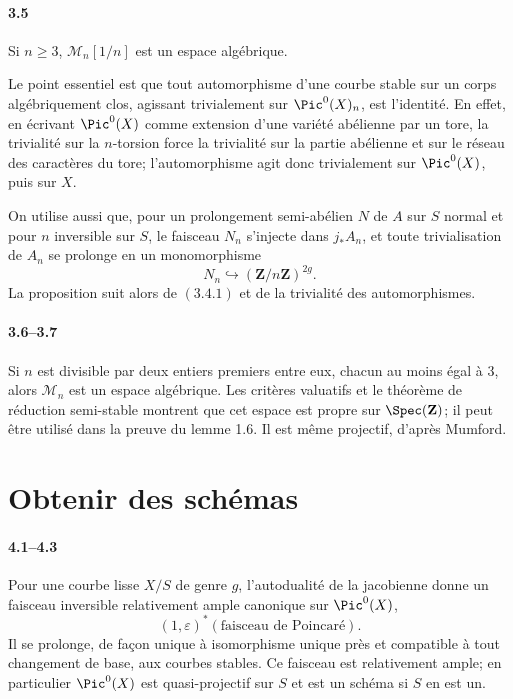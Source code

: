 \paragraph{3.5}
\begin{proposition}
Si $n\ge3$, $\mathcal M_n[1/n]$ est un espace algébrique.
\end{proposition}

Le point essentiel est que tout automorphisme d'une courbe stable sur un corps algébriquement clos, agissant trivialement sur $\Pic^0(X)_n$, est l'identité. En effet, en écrivant $\Pic^0(X)$ comme extension d'une variété abélienne par un tore, la trivialité sur la $n$-torsion force la trivialité sur la partie abélienne et sur le réseau des caractères du tore; l'automorphisme agit donc trivialement sur $\Pic^0(X)$, puis sur $X$.

On utilise aussi que, pour un prolongement semi-abélien $N$ de $A$ sur $S$ normal et pour $n$ inversible sur $S$, le faisceau $N_n$ s'injecte dans $j_*A_n$, et toute trivialisation de $A_n$ se prolonge en un monomorphisme
\[
  N_n\hookrightarrow (\mathbf Z/n\mathbf Z)^{2g}.
\]
La proposition suit alors de \((3.4.1)\) et de la trivialité des automorphismes.

\paragraph{3.6--3.7}
Si $n$ est divisible par deux entiers premiers entre eux, chacun au moins égal à $3$, alors $\mathcal M_n$ est un espace algébrique. Les critères valuatifs et le théorème de réduction semi-stable montrent que cet espace est propre sur $\Spec(\mathbf Z)$; il peut être utilisé dans la preuve du lemme 1.6. Il est même projectif, d'après Mumford.

\section{Obtenir des schémas}

\paragraph{4.1--4.3}
Pour une courbe lisse $X/S$ de genre $g$, l'autodualité de la jacobienne donne un faisceau inversible relativement ample canonique sur $\Pic^0(X)$,
\[
  (1,\varepsilon)^*(\text{faisceau de Poincaré}).
\]
Il se prolonge, de façon unique à isomorphisme unique près et compatible à tout changement de base, aux courbes stables. Ce faisceau est relativement ample; en particulier $\Pic^0(X)$ est quasi-projectif sur $S$ et est un schéma si $S$ en est un.

